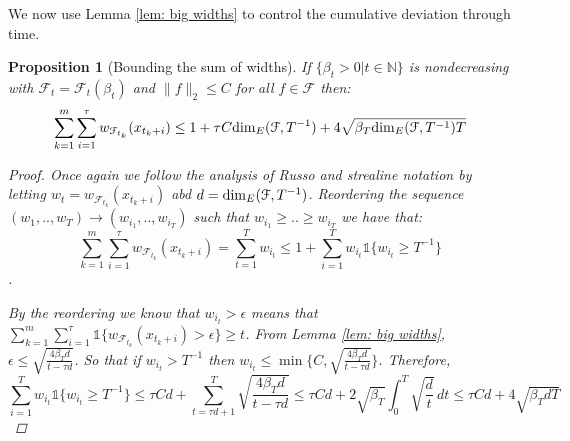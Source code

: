 \documentclass{article}
\newtheorem{prop}{Proposition}
\newcommand{\Nat}{\mathbb{N}}
\newcommand{\Ind}{\mathds{1}}
\newcommand{\Fc}{\mathcal{F}}
\begin{document}
We now use Lemma \ref{lem: big widths} to control the cumulative deviation through time.
\begin{prop}[Bounding the sum of widths]
\hspace{0.00000000000001mm} \newline
\label{prop: widths}
If $\{ \beta_t >0 \big| t \in \Nat \}$ is nondecreasing with $\Fc_t = \Fc_t(\beta_t)$ and $\|f\|_2 \le C$ for all $f \in \Fc$ then:
\begin{equation}
	\sum_{k=1}^m \sum_{i=1}^\tau w_{\Fc_{t_k}}(x_{t_k+i}) \le
	1 + \tau C {\rm dim}_E(\Fc,T^{-1}) + 4\sqrt{\beta_T {\rm dim}_E(\Fc,T^{-1}) T}
\end{equation}

\begin{proof}
Once again we follow the analysis of Russo \cite{russo2013} and strealine notation by letting $w_t = w_{\Fc_{t_k}}(x_{t_k+i})$ abd $d = {\rm dim}_E(\Fc,T^{-1})$.
Reordering the sequence $(w_1,..,w_T) \rightarrow (w_{i_1},..,w_{i_T})$ such that $w_{i_1}\ge..\ge w_{i_T}$
we have that:
$$ \sum_{k=1}^m \sum_{i=1}^\tau w_{\mathcal{F}_{t_k}}(x_{t_k+i})  = \sum_{t=1}^T w_{i_t} \le 1 + \sum_{i=1}^T w_{i_t} \Ind \{ w_{i_t} \ge T^{-1} \} $$.

By the reordering we know that $w_{i_t} > \epsilon$ means that $\sum_{k=1}^m \sum_{i=1}^\tau \Ind \{w_{\Fc_{t_k}}(x_{t_k+i}) > \epsilon \} \ge t $.
From Lemma \ref{lem: big widths}, $\epsilon \le \sqrt{\frac{4 \beta_T d}{t - \tau d}}$.
So that if $w_{i_t} > T^{-1}$ then $w_{i_t} \le \min \{ C , \sqrt{\frac{4 \beta_T d}{t - \tau d}} \}$. Therefore,
$$\sum_{i=1}^T w_{i_t} \Ind \{ w_{i_t} \ge T^{-1} \} \le \tau C d + \sum_{t=\tau d +1}^T \sqrt{\frac{4 \beta_T d}{t - \tau d}} \le
\tau C d + 2 \sqrt{\beta_T} \int_0^T \sqrt{ \frac{d}{t} } \,dt \le \tau C d + 4 \sqrt{\beta_T d T}$$

\end{proof}

\end{prop}


\end{document}
